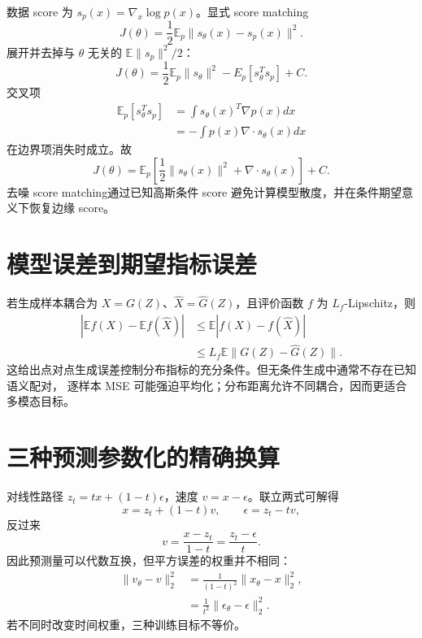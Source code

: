 \documentclass[11pt]{article}
\numberwithin{equation}{section}
\newcommand{\E}{\mathbb{E}}
\newcommand{\1}{\mathbf{1}}
\begin{document}
数据 score 为 $s_p(x)=\nabla_x\log p(x)$。显式 score matching
\begin{equation}
 J(\theta)=\frac12\E_p\|s_\theta(x)-s_p(x)\|^2.
\end{equation}
展开并去掉与 $\theta$ 无关的 $\E\|s_p\|^2/2$：
\begin{equation}
 J(\theta)=\frac12\E_p\|s_\theta\|^2-E_p[s_\theta^Ts_p]+C.
\end{equation}
交叉项
\begin{align}
 \E_p[s_\theta^Ts_p]
 &=\int s_\theta(x)^T\nabla p(x)dx\\
 &=-\int p(x)\nabla\cdot s_\theta(x)dx
\end{align}
在边界项消失时成立。故
\begin{equation}
 J(\theta)=\E_p\left[
 \frac12\|s_\theta(x)\|^2+\nabla\cdot s_\theta(x)
 \right]+C.
\end{equation}
去噪 score matching通过已知高斯条件 score 避免计算模型散度，并在条件期望意义下恢复边缘 score。

\section{模型误差到期望指标误差}

若生成样本耦合为 $X=G(Z)$、$\widehat X=\widehat G(Z)$，且评价函数
$f$ 为 $L_f$-Lipschitz，则
\begin{align}
 |\E f(X)-\E f(\widehat X)|
 &\le\E|f(X)-f(\widehat X)|\\
 &\le L_f\E\|G(Z)-\widehat G(Z)\|.
\end{align}
这给出点对点生成误差控制分布指标的充分条件。但无条件生成中通常不存在已知语义配对，
逐样本 MSE 可能强迫平均化；分布距离允许不同耦合，因而更适合多模态目标。

\section{三种预测参数化的精确换算}
对线性路径 $z_t=t x+(1-t)\epsilon$，速度 $v=x-\epsilon$。联立两式可解得
\begin{equation}
  x=z_t+(1-t)v,\qquad
  \epsilon=z_t-tv,
\end{equation}
反过来
\begin{equation}
  v=\frac{x-z_t}{1-t}=\frac{z_t-\epsilon}{t}.
\end{equation}
因此预测量可以代数互换，但平方误差的权重并不相同：
\begin{align}
  \|v_\theta-v\|_2^2
  &=\frac{1}{(1-t)^2}\|x_\theta-x\|_2^2,\\
  &=\frac{1}{t^2}\|\epsilon_\theta-\epsilon\|_2^2.
\end{align}
若不同时改变时间权重，三种训练目标不等价。
\end{document}
